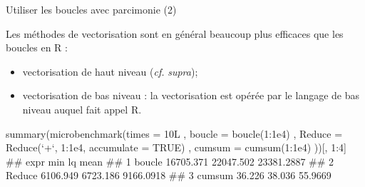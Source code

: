 \documentclass[12pt,ignorenonframetext,]{beamer}
\newenvironment{Shaded}{}{}
\newcommand{\KeywordTok}[1]{\textcolor[rgb]{0.00,0.00,1.00}{#1}}
\newcommand{\DataTypeTok}[1]{#1}
\newcommand{\DecValTok}[1]{#1}
\newcommand{\FloatTok}[1]{#1}
\newcommand{\StringTok}[1]{\textcolor[rgb]{0.00,0.50,0.50}{#1}}
\newcommand{\OtherTok}[1]{\textcolor[rgb]{1.00,0.25,0.00}{#1}}
\newcommand{\OperatorTok}[1]{#1}
\newcommand{\NormalTok}[1]{#1}
\providecommand{\tightlist}{%
  \setlength{\itemsep}{0pt}\setlength{\parskip}{0pt}}
\renewenvironment{Shaded}{\begin{snugshade}}{\end{snugshade}}
\begin{document}
\begin{frame}[fragile]{Utiliser les boucles avec parcimonie (2)}

\small
Les méthodes de vectorisation sont en général beaucoup plus efficaces
que les boucles en R :

\begin{itemize}
\tightlist
\item
  vectorisation de haut niveau (\emph{cf.} \emph{supra});
\item
  vectorisation de bas niveau : la vectorisation est opérée par le
  langage de bas niveau auquel fait appel R.
\end{itemize}

\pause \footnotesize

\begin{Shaded}
\begin{Highlighting}[]
\KeywordTok{summary}\NormalTok{(}\KeywordTok{microbenchmark}\NormalTok{(}\DataTypeTok{times =}\NormalTok{ 10L}
\NormalTok{  , }\DataTypeTok{boucle =} \KeywordTok{boucle}\NormalTok{(}\DecValTok{1}\OperatorTok{:}\FloatTok{1e4}\NormalTok{)}
\NormalTok{  , }\DataTypeTok{Reduce =} \KeywordTok{Reduce}\NormalTok{(}\StringTok{`}\DataTypeTok{+}\StringTok{`}\NormalTok{, }\DecValTok{1}\OperatorTok{:}\FloatTok{1e4}\NormalTok{, }\DataTypeTok{accumulate =} \OtherTok{TRUE}\NormalTok{)}
\NormalTok{  , }\DataTypeTok{cumsum =} \KeywordTok{cumsum}\NormalTok{(}\DecValTok{1}\OperatorTok{:}\FloatTok{1e4}\NormalTok{)}
\NormalTok{))[, }\DecValTok{1}\OperatorTok{:}\DecValTok{4}\NormalTok{]}
\NormalTok{  ##     expr       min        lq       mean}
\NormalTok{  ## 1 boucle 16705.371 22047.502 23381.2887}
\NormalTok{  ## 2 Reduce  6106.949  6723.186  9166.0918}
\NormalTok{  ## 3 cumsum    36.226    38.036    55.9669}
\end{Highlighting}
\end{Shaded}

\end{frame}
\end{document}
